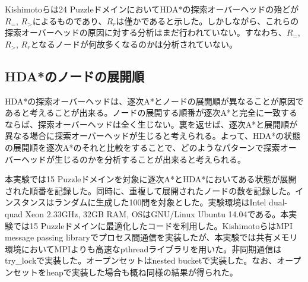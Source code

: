 \documentclass[uplatex]{jsarticle}
\begin{document}
Kishimotoらは24 PuzzleドメインにおいてHDA*の探索オーバーヘッドの殆どが$R_{=}$, $R_{>}$によるものであり、$R_{r}$は僅かであると示した。しかしながら、これらの探索オーバーヘッドの原因に対する分析はまだ行われていない。すなわち、$R_{=}$, $R_{>}$, $R_{r}$となるノードが何故多くなるのかは分析されていない。

\subsection{HDA*のノードの展開順}
HDA*の探索オーバーヘッドは、逐次A*とノードの展開順が異なることが原因であると考えることが出来る。ノードの展開する順番が逐次A*と完全に一致するならば、探索オーバーヘッドは全く生じない。裏を返せば、逐次A*と展開順が異なる場合に探索オーバーヘッドが生じると考えられる。よって、HDA*の状態の展開順を逐次A*のそれと比較をすることで、どのようなパターンで探索オーバーヘッドが生じるのかを分析することが出来ると考えられる。

本実験では15 Puzzleドメインを対象に逐次A*とHDA*においてある状態が展開された順番を記録した。同時に、重複して展開されたノードの数を記録した。インスタンスはランダムに生成した100問を対象とした。実験環境はIntel dual-quad Xeon 2.33GHz, 32GB RAM, OSはGNU/Linux Ubuntu 14.04である。本実験では15 Puzzleドメインに最適化したコードを利用した。KishimotoらはMPI message passing libraryでプロセス間通信を実装したが、本実験では共有メモリ環境においてMPIよりも高速なpthreadライブラリを用いた。非同期通信はtry\_lockで実装した。オープンセットはnested bucketで実装した。なお、オープンセットをheapで実装した場合も概ね同様の結果が得られた。
\newline


\end{document}
